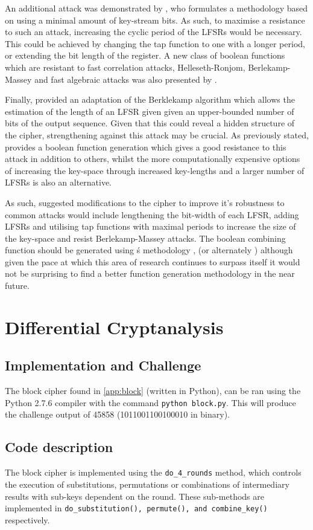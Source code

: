 \documentclass[british,10pt,a4paper]{article}
\begin{document}
An additional attack was demonstrated by \citet{helleseth}, who formulates a methodology based on using a minimal amount of key-stream bits. As such, to maximise a resistance to such an attack, increasing the cyclic period of the LFSRs would be necessary. This could be achieved by changing the tap function to one with a longer period, or extending the bit length of the register. A new class of boolean functions which are resistant to fast correlation attacks, Helleseth-Ronjom, Berlekamp-Massey and fast algebraic attacks was also presented by \citet{carlet2}.

Finally, \citet{massey} provided an adaptation of the Berklekamp algorithm which allows the estimation of the length of an LFSR given \citet{massey} given an upper-bounded number of bits of the output sequence. Given that this could reveal a hidden structure of the cipher, strengthening against this attack may be crucial. As previously stated, \citeauthor{carlet2} provides a boolean function generation which gives a good resistance to this attack in addition to others, whilst the more computationally expensive options of increasing the key-space through increased key-lengths and a larger number of LFSRs is also an alternative.

As such, suggested modifications to the cipher to improve it's robustness to common attacks would include lengthening the bit-width of each LFSR, adding LFSRs and utilising tap functions with maximal periods to increase the size of the key-space and resist Berlekamp-Massey attacks. The boolean combining function should be generated using \citeauthor{carlet2}\'s methodology \cite{carlet2}, (or alternately \citet{tang}) although given the pace at which this area of research continues to surpass itself it would not be surprising to find a better function generation methodology in the near future.

\clearpage
\section{Differential Cryptanalysis}
\subsection{Implementation and Challenge}
The block cipher found in \autoref{app:block} (written in Python),{}
can be ran using the Python 2.7.6 compiler with the command \lstinline{python block.py}. This will produce the
challenge output of 45858 (1011001100100010 in binary).
\subsection{Code description}
The block cipher is implemented using the \lstinline{do_4_rounds} method, which controls the execution of substitutions, permutations or combinations
of intermediary results with sub-keys dependent on the round. These sub-methods are implemented in \lstinline{do_substitution(), permute(), and combine_key()} respectively.
\end{document}
